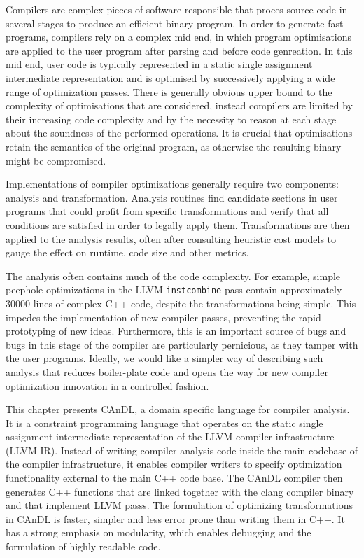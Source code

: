     Compilers are complex pieces of software responsible that proces source code
    in several stages to produce an efficient binary program.
    In order to generate fast programs, compilers rely on a complex mid end, in
    which program optimisations are applied to the user program after parsing
    and before code genreation.
    In this mid end, user code is typically represented in a static single
    assignment intermediate representation and is optimised by successively
    applying a wide range of optimization passes.
    There is generally obvious upper bound to the complexity of optimisations
    that are considered, instead compilers are limited by their increasing code
    complexity and by the necessity to reason at each stage about the soundness
    of the performed operations.
    It is crucial that optimisations retain the semantics of the original
    program, as otherwise the resulting binary might be compromised.
    

    Implementations of compiler optimizations generally require two components:
    analysis and transformation.
    Analysis routines find candidate sections in user programs that could profit
    from specific transformations and verify that all conditions are satisfied
    in order to legally apply them.
    Transformations are then applied to the analysis results, often after
    consulting heuristic cost models to gauge the effect on runtime, code size
    and other metrics.

    The analysis often contains much of the code complexity.
    For example, simple peephole optimizations in the LLVM {\tt instcombine}
    pass contain approximately 30000 lines of complex C++ code, despite the
    transformations being simple.
    This impedes the implementation of new compiler passes, preventing the rapid
    prototyping of new ideas.
    Furthermore, this is an important source of bugs and bugs in this stage of
    the compiler are particularly pernicious, as they tamper with the user
    programs.
    Ideally, we would like a simpler way of describing such analysis that
    reduces boiler-plate code and opens the way for new compiler optimization
    innovation in a controlled fashion.

    This chapter presents CAnDL, a domain specific language for compiler
    analysis.
    It is a constraint programming language that operates on the static single
    assignment intermediate representation of the LLVM compiler infrastructure
    (LLVM IR).
    Instead of writing compiler analysis code inside the main codebase of the
    compiler infrastructure, it enables compiler writers to specify optimization
    functionality external to the main C++ code base.
    The CAnDL compiler then generates C++ functions that are linked together
    with the clang compiler binary and that implement LLVM passs.
    The formulation of optimizing transformations in CAnDL is faster, simpler
    and less error prone than writing them in C++.
    It has a strong emphasis on modularity, which enables debugging and the
    formulation of highly readable code.

